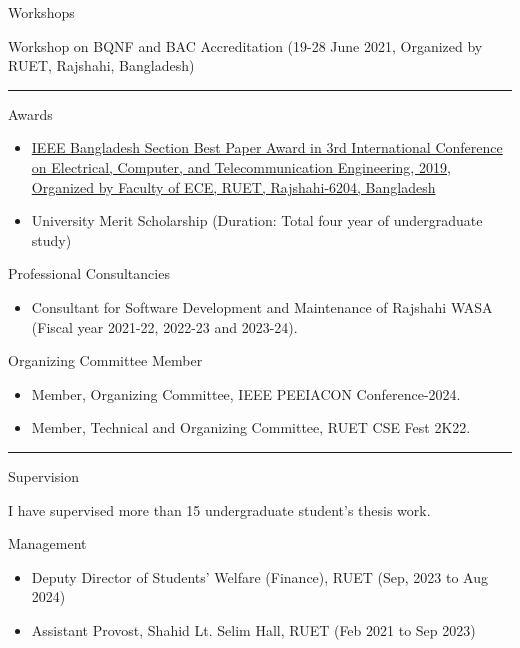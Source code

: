 \documentclass[a4paper,10pt]{article}
\newlength{\cvcolumngapwidth}
\newlength{\cvleftcolumnwidth}
\newlength{\cvrightcolumnwidth}
\newcommand{\cvsectionstyle}[1]{{\normalsize\cvsectionfont\textcolor{cvsectioncolor}{#1}}}
\newcommand{\cvheadingstyle}[1]{{\normalsize\cvheadingfont\textcolor{cvheadingcolor}{#1}}}
\newlength{\cvafteritemskipamount}
\newlength{\cvaftersectionskipamount}
\newlength{\cvbetweensectionandheadingextraskipamount}
\newlength{\cvparskip}
\newcommand{\cvsection}[1]{
    \begin{minipage}[t]{\cvleftcolumnwidth}
        \raggedleft\cvsectionstyle{#1}
    \end{minipage}%
    \hspace{\cvcolumngapwidth}%
    \begin{minipage}[t]{\cvrightcolumnwidth}
        \textcolor{cvrulecolor}{\rule{\cvrightcolumnwidth}{0.3mm}}
    \end{minipage}

    \vspace{\cvaftersectionskipamount}
}
\newcommand{\cvitem}[2]{
    \begin{minipage}[t]{\cvleftcolumnwidth}
        \raggedleft #1
    \end{minipage}%
    \hspace{\cvcolumngapwidth}%
    \begin{minipage}[t]{\cvrightcolumnwidth}
        \setlength{\parskip}{\cvparskip} #2
    \end{minipage}

    \vspace{\cvafteritemskipamount}
}
\begin{document}
\cvitem{
    \cvheadingstyle{Workshops}
}{
Workshop on BQNF and BAC Accreditation (19-28 June 2021, Organized by RUET, Rajshahi, Bangladesh)
}

\cvsection{HONORS \& MEMBERSHIPS}

\vspace{\cvbetweensectionandheadingextraskipamount}

\cvitem{
    \cvheadingstyle{Awards}
}{
    \begin{itemize}
    \item{\href{https://www.ruet.ac.bd/news-and-event/icecte-2019-best-paper-award-won-by-cse-faculty-member}{IEEE Bangladesh Section Best Paper Award in 3rd International Conference on Electrical, Computer, and Telecommunication Engineering, 2019, Organized by Faculty of ECE, RUET, Rajshahi-6204, Bangladesh}}
    \item{University Merit Scholarship (Duration: Total four year of undergraduate study)}
    \end{itemize}
}

\cvitem{
    \cvheadingstyle{Professional Consultancies}
}{
    \begin{itemize}
    \item Consultant for Software Development and Maintenance of Rajshahi WASA (Fiscal year 2021-22, 2022-23 and 2023-24).
    \end{itemize}
}

\cvitem{
    \cvheadingstyle{Organizing Committee Member}
}{
    \begin{itemize}
    \item Member, Organizing Committee, IEEE PEEIACON Conference-2024.
    \item Member, Technical and Organizing Committee, RUET CSE Fest 2K22.
    \end{itemize}
}

\cvsection{SUPERVISION \& MANAGEMENT}
\cvitem{
    \cvheadingstyle{Supervision}
}{
    I have supervised more than 15 undergraduate student's thesis work.
}
\cvitem{
    \cvheadingstyle{Management}
}{
    \begin{itemize}
    \item Deputy Director of Students' Welfare (Finance), RUET (Sep, 2023 to Aug 2024)
    \item Assistant Provost, Shahid Lt. Selim Hall, RUET (Feb 2021 to Sep 2023)
    \end{itemize}
}
\end{document}
